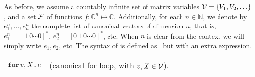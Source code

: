 As before, we assume a countably infinite set of matrix variables $\mathcal{V} = \{V_1, V_2, \ldots\}$, and a set $\mathcal{F}$  of functions $f:\mathbb{C}^n \mapsto \mathbb{C}$. Additionally, for each $n\in \mathbb{N}$, we denote by $e_1^n,\ldots ,e_n^n$ the complete list of canonical vectors of dimension $n$; that is, $e_1^n = [1\ 0 \cdots 0]^*$, $e_2^n = [0\ 1\ 0 \cdots 0]^*$, etc. When $n$ is clear from the context we will simply write $e_1,e_2$, etc. The syntax of \langfor is defined as \lang\, but with an extra expression.


\medskip

\begin{tabular}{lcll}
 $\texttt{for}\, v,X \texttt{.}\, e$ & (canonical for loop, with $v, X \in \mathcal{V}$). 
\end{tabular}

\medskip



